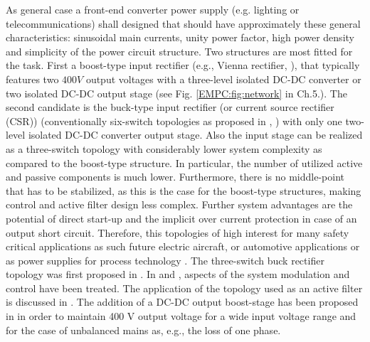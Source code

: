 

As  general case a front-end  converter power supply (e.g. lighting or telecommunications) shall designed that should have approximately these general characteristics: sinusoidal main currents, unity power factor, high power density and simplicity of the power circuit structure. Two structures are most fitted for the task. First a boost-type input rectifier (e.g., Vienna rectifier, \cite{kolar1996design}), that typically features two $400V$ output voltages with a three-level isolated  DC-DC  converter  or  two  isolated  DC-DC  output  stage (see Fig. \ref{EMPC:fig:network} in Ch.5.). The second candidate is the buck-type  input  rectifier (or current source rectifier (CSR))  (conventionally  six-switch topologies as proposed in \cite{zargari1993current}, \cite{sato1993state}) with only one two-level isolated  DC-DC  converter  output  stage.  Also the  input  stage  can be realized as a three-switch topology with considerably  lower  system  complexity  as  compared  to  the boost-type structure. In particular, the number of utilized active and passive components is much lower. Furthermore, there is no middle-point that has to be stabilized, as this is the case for the boost-type structures, making control and active filter design less complex. Further system advantages are the potential of direct start-up and the implicit over current protection in case of an output short circuit. Therefore, this topologies of high interest for many safety critical applications as such future electric aircraft, or automotive applications or as power supplies for process technology \cite{nussbaumer2007comprehensive}.
The three-switch buck rectifier topology was first proposed in \cite{malesani1987three}. In \cite{itoh1989steady} and \cite{tooth2000effects}, aspects of the system modulation and control have been treated. The application of the topology used as an active filter is discussed in \cite{salo2005three}.  The addition of a DC-DC output boost-stage has been proposed in \cite{baumannnew} in order to maintain 400 V output voltage for a wide input voltage range and for the case of unbalanced mains as, e.g., the loss of one phase.

\label{BASICCSR:sec:OperationPrinciple}

